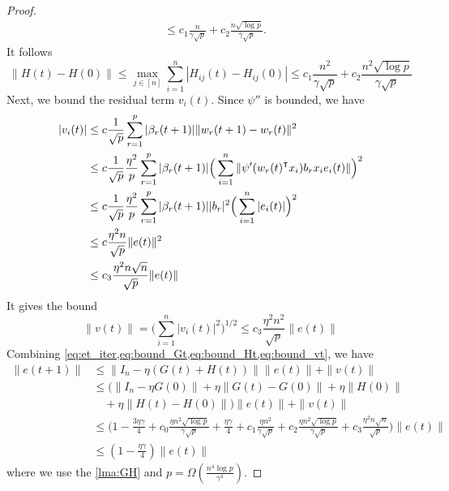 \begin{proof}
\begin{equation*}
\begin{aligned}
    &\leq c_1 \frac{n}{\gamma\sqrt p} + c_2\frac{n\sqrt{\log p}}{\gamma\sqrt p}.
\end{aligned}
\end{equation*}
It follows
\begin{equation}\label{eq:bound_Ht}
    \|H(t)-H(0)\| \leq \max_{j \in [n]}\sum_{i=1}^n|H_{ij}(t) - H_{ij}(0)| \leq c_1 \frac{n^2}{\gamma\sqrt p} + c_2\frac{n^2\sqrt{\log p}}{\gamma\sqrt p}
\end{equation}
Next, we bound the residual term $v_i(t)$. Since $\psi''$ is bounded, we have
\begin{equation*}
\begin{aligned}
    |v_i(t)|
    &\leq c\frac{1}{\sqrt p}\sum_{r=1}^p|\beta_r(t+1)|\|w_r(t+1)-w_r(t)\|^2 \\
    &\leq c\frac{1}{\sqrt p}\frac{\eta^2}{p}\sum_{r=1}^p|\beta_r(t+1)|\Big(\sum_{i=1}^n\|\psi'(w_r(t)\transpose x_i)b_rx_ie_i(t)\|\Big)^2 \\
    &\leq c\frac{1}{\sqrt p}\frac{\eta^2}{p}\sum_{r=1}^p|\beta_r(t+1)||b_r|^2\Big(\sum_{i=1}^n|e_i(t)|\Big)^2 \\
    &\leq c\frac{\eta^2n}{\sqrt p}\|e(t)\|^2 \\
    &\leq c_3\frac{\eta^2n\sqrt n}{\sqrt p}\|e(t)\|
\end{aligned}
\end{equation*}
It gives the bound
\begin{equation}\label{eq:bound_vt}
    \|v(t)\| =\Big(\sum_{i=1}^n|v_i(t)|^2\Big)^{1/2} \leq c_3\frac{\eta^2n^2}{\sqrt p}\|e(t)\|
\end{equation}
Combining \cref{eq:et_iter,eq:bound_Gt,eq:bound_Ht,eq:bound_vt}, we have
\begin{equation*}
\begin{aligned}
\|e(t+1)\|
&\leq \|I_n-\eta (G(t)+H(t))\|\|e(t)\|+\|v(t)\| \\
&\leq \Big(\|I_n-\eta G(0)\|+\eta\|G(t)-G(0)\|+\eta\|H(0)\| \\
&\quad +\eta\|H(t)-H(0)\|\Big)\|e(t)\| + \|v(t)\| \\
&\leq \Big( 1-\frac{3\eta\gamma}{4}+c_0\frac{\eta n^2\sqrt{\log p}}{\gamma\sqrt p}+\frac{\eta\gamma}{4}+c_1\frac{\eta n^2}{\gamma\sqrt p} + c_2\frac{\eta n^2\sqrt{\log p}}{\gamma\sqrt p}+c_3\frac{\eta^2n\sqrt n}{\sqrt p}\Big)\|e(t)\|  \\
&\leq(1-\frac{\eta\gamma}{4})\|e(t)\|
\end{aligned}
\end{equation*}
where we use the \cref{lma:GH} and $p=\Omega(\frac{n^4\log p}{\gamma^4})$.
\end{proof}

